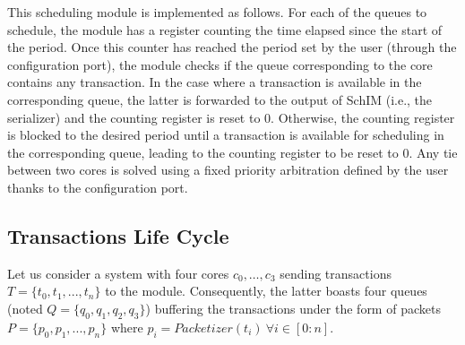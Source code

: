             This scheduling module is implemented as follows. For each of the queues to schedule, the module has a register counting the time elapsed since the start of the period. Once this counter has reached the period set by the user (through the configuration port), the module checks if the queue corresponding to the core contains any transaction. In the case where a transaction is available in the corresponding queue, the latter is forwarded to the output of SchIM (i.e., the serializer) and the counting register is reset to 0. Otherwise, the counting register is blocked to the desired period until a transaction is available for scheduling in the corresponding queue, leading to the counting register to be reset to 0. Any tie between two cores is solved using a fixed priority arbitration defined by the user thanks to the configuration port. 


        \subsection{Transactions Life Cycle}
            \label{subsec:transaction-life-cycle}

            Let us consider a system with four cores $c_0, \ldots, c_3$ sending
            transactions $T = \{t_{0}, t_{1}, ..., t_{n}\}$ to the \schim module.
            Consequently, the latter boasts four queues (noted $Q = \{q_{0},
            q_{1}, q_{2}, q_{3}\}$) buffering the transactions under the form of
            packets $P = \{p_{0}, p_{1}, ..., p_{n}\}$ where $p_{i} =
            Packetizer(t_{i})~\forall i \in [0 : n]$.

